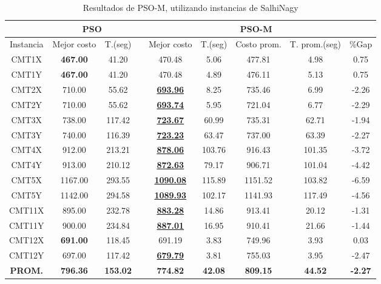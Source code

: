 \begin{table}[h]
\caption{ Resultados de PSO-M, utilizando instancias de SalhiNagy}
\centering
\scriptsize
\begin{tabular*}{1.00\textwidth}{@{\extracolsep{\fill}} |c||c c||c c c c c c|}
\hline
 & \multicolumn{2}{c||}{\bf{PSO}} & \multicolumn{6}{c|}{\bf{PSO-M}}\\\hline
Instancia & Mejor costo & T.(seg) & & Mejor costo & T.(seg) & Costo prom. & T. prom.(seg) & \%Gap\\ [0.5ex]
\hline\hline
CMT1X & \bf{467.00} & 41.20 & & 
470.48 & 5.06 & 477.81 & 4.98 & 0.75\\CMT1Y & \bf{467.00} & 41.20 & & 
470.48 & 4.89 & 476.11 & 5.13 & 0.75\\CMT2X & 710.00 & 55.62 & & \bf{\underline{693.96}} & 
8.25 & 735.46 & 6.99 & -2.26\\CMT2Y & 710.00 & 55.62 & & \bf{\underline{693.74}} & 
5.95 & 721.04 & 6.77 & -2.29\\CMT3X & 738.00 & 117.42 & & \bf{\underline{723.67}} & 
60.99 & 735.31 & 62.71 & -1.94\\CMT3Y & 740.00 & 116.39 & & \bf{\underline{723.23}} & 
63.47 & 737.00 & 63.39 & -2.27\\CMT4X & 912.00 & 213.21 & & \bf{\underline{878.06}} & 
103.76 & 916.43 & 101.35 & -3.72\\CMT4Y & 913.00 & 210.12 & & \bf{\underline{872.63}} & 
79.17 & 906.71 & 101.04 & -4.42\\CMT5X & 1167.00 & 293.55 & & \bf{\underline{1090.08}} & 
115.89 & 1151.52 & 103.82 & -6.59\\CMT5Y & 1142.00 & 294.58 & & \bf{\underline{1089.93}} & 
102.17 & 1141.93 & 117.49 & -4.56\\CMT11X & 895.00 & 232.78 & & \bf{\underline{883.28}} & 
14.86 & 913.41 & 20.12 & -1.31\\CMT11Y & 900.00 & 234.84 & & \bf{\underline{887.01}} & 
16.95 & 910.41 & 21.66 & -1.44\\CMT12X & \bf{691.00} & 118.45 & & 
691.19 & 3.83 & 749.96 & 3.93 & 0.03\\CMT12Y & 697.00 & 117.42 & & \bf{\underline{679.79}} & 
3.81 & 755.03 & 3.95 & -2.47\\\hline\hline\bf{PROM.} & 
\bf{796.36} & \bf{153.02} & & \bf{774.82} & \bf{42.08} & \bf{809.15} & \bf{44.52} & \bf{-2.27}\\[1ex]\hline
\end{tabular*}
\label{apendice-table:pso-finalS}
\end{table}


